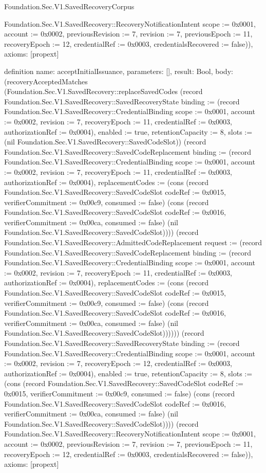 \begin{lexlean}{Foundation.Sec.V1.SavedRecoveryCorpus}
\begin{semanticmodule}
{Foundation.Sec.V1.SavedRecovery::RecoveryNotificationIntent {scope := 0x0001, account := 0x0002, previousRevision := 7, revision := 7, previousEpoch := 11, recoveryEpoch := 12, credentialRef := 0x0003, credentialsRecovered := false})),
  axioms: [propext]
}

definition{
  name: acceptInitialIssuance,
  parameters: [],
  result: Bool,
  body: (recoveryAcceptedMatches (Foundation.Sec.V1.SavedRecovery::replaceSavedCodes (record Foundation.Sec.V1.SavedRecovery::SavedRecoveryState {binding := (record Foundation.Sec.V1.SavedRecovery::CredentialBinding {scope := 0x0001, account := 0x0002, revision := 7, recoveryEpoch := 11, credentialRef := 0x0003, authorizationRef := 0x0004}), enabled := true, retentionCapacity := 8, slots := (nil Foundation.Sec.V1.SavedRecovery::SavedCodeSlot)}) (record Foundation.Sec.V1.SavedRecovery::SavedCodeReplacement {binding := (record Foundation.Sec.V1.SavedRecovery::CredentialBinding {scope := 0x0001, account := 0x0002, revision := 7, recoveryEpoch := 11, credentialRef := 0x0003, authorizationRef := 0x0004}), replacementCodes := (cons (record Foundation.Sec.V1.SavedRecovery::SavedCodeSlot {codeRef := 0x0015, verifierCommitment := 0x00c9, consumed := false}) (cons (record Foundation.Sec.V1.SavedRecovery::SavedCodeSlot {codeRef := 0x0016, verifierCommitment := 0x00ca, consumed := false}) (nil Foundation.Sec.V1.SavedRecovery::SavedCodeSlot)))}) (record Foundation.Sec.V1.SavedRecovery::AdmittedCodeReplacement {request := (record Foundation.Sec.V1.SavedRecovery::SavedCodeReplacement {binding := (record Foundation.Sec.V1.SavedRecovery::CredentialBinding {scope := 0x0001, account := 0x0002, revision := 7, recoveryEpoch := 11, credentialRef := 0x0003, authorizationRef := 0x0004}), replacementCodes := (cons (record Foundation.Sec.V1.SavedRecovery::SavedCodeSlot {codeRef := 0x0015, verifierCommitment := 0x00c9, consumed := false}) (cons (record Foundation.Sec.V1.SavedRecovery::SavedCodeSlot {codeRef := 0x0016, verifierCommitment := 0x00ca, consumed := false}) (nil Foundation.Sec.V1.SavedRecovery::SavedCodeSlot)))})})) (record Foundation.Sec.V1.SavedRecovery::SavedRecoveryState {binding := (record Foundation.Sec.V1.SavedRecovery::CredentialBinding {scope := 0x0001, account := 0x0002, revision := 7, recoveryEpoch := 12, credentialRef := 0x0003, authorizationRef := 0x0004}), enabled := true, retentionCapacity := 8, slots := (cons (record Foundation.Sec.V1.SavedRecovery::SavedCodeSlot {codeRef := 0x0015, verifierCommitment := 0x00c9, consumed := false}) (cons (record Foundation.Sec.V1.SavedRecovery::SavedCodeSlot {codeRef := 0x0016, verifierCommitment := 0x00ca, consumed := false}) (nil Foundation.Sec.V1.SavedRecovery::SavedCodeSlot)))}) (record Foundation.Sec.V1.SavedRecovery::RecoveryNotificationIntent {scope := 0x0001, account := 0x0002, previousRevision := 7, revision := 7, previousEpoch := 11, recoveryEpoch := 12, credentialRef := 0x0003, credentialsRecovered := false})),
  axioms: [propext]
}


\end{semanticmodule}
\end{lexlean}
